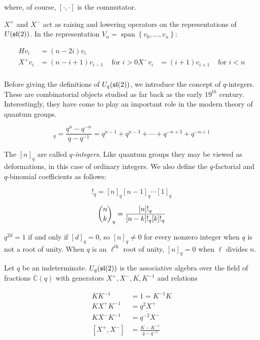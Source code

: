 where, of course, $[\cdot, \cdot]$ is the commutator.

$X^+$ and $X^-$ act as raising and lowering operators on the representations of
$U(\mathfrak{sl}(2))$. In the representation $V_n = \operatorname{span}\left\{ v_0,
\ldots, v_n \right\}$:

\begin{align}
    H v_i &= (n - 2i) v_i \\
    X^+ v_i &= (n-i+1)v_{i-1} &\text{ for $i > 0$} 
    X^- v_i &= (i+1)v_{i+1}   &\text{ for $i < n$}  \\
\end{align}

Before giving the definitions of $U_q(\mathfrak{sl}(2))$, we introduce the concept of
$q$-integers. These are combinatorial objects studied as far back as the early
$19^{th}$ century. Interestingly, they have come to play an important role in
the modern theory of quantum groups. 

\begin{equation}
    [n]_q = \frac{q^n - q^{-n}}{q - q^{-1}} = q^{n-1} + q^{n-3} + \cdots + q^{-n+3} + q^{-n+1}
\end{equation}

The $[n]_q$ are called \emph{$q$-integers}. Like quantum groups they may be
viewed as deformations, in this case of ordinary integers. We also define the
$q$-factorial and $q$-binomial coefficients as follows:

\begin{equation}
    [n]!_q = [n]_q [n-1]_q \cdots [1]_q
\end{equation}

\begin{equation}
    \dbinom{n}{k}_q = \frac{[n]!_q}{[n-k]!_q[k]!_q}
\end{equation}

$q^{2d}=1$ if and only if $[d]_q = 0$, so $[n]_q \neq 0$ for every nonzero
integer when $q$ is not a root of unity. When $q$ is an $\ell^\text{th}$ root
of unity, $[n]_q = 0$ when $\ell$ divides $n$.

\begin{defn}
\label{Uqsl2Def}
Let $q$ be an indeterminate. $U_q(\mathfrak{sl}(2))$ is the associative algebra over the
field of fractions $\mathbb{C}(q)$ with generators $X^+,X^-,K, K^{-1}$ and
relations 

\begin{align}
    KK^{-1} &= 1 = K^{-1}K \\
    K X^+ K^{-1} &= q^2  X^+  \\
    KX^-K^{-1} &= q^{-2} X^- \\
    [ X^+ ,X^-] &= \frac{K - K^{-1}}{q - q^{-1}} \label{equation:hadamard}
\end{align}
\end{defn}

